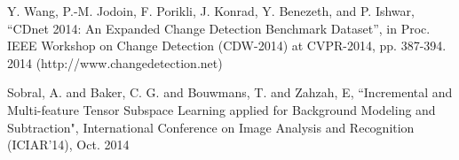 \documentclass[conference]{IEEEtran}
\begin{document}
\begin{thebibliography}{7}
Y. Wang, P.-M. Jodoin, F. Porikli, J. Konrad, Y. Benezeth, and P. Ishwar, ``CDnet 2014: An Expanded Change Detection Benchmark Dataset'', 
in Proc. IEEE Workshop on Change Detection (CDW-2014) at CVPR-2014, pp. 387-394. 2014
(http://www.changedetection.net)


Sobral, A. and Baker, C. G. and Bouwmans, T. and Zahzah, E, ``Incremental and Multi-feature Tensor Subspace Learning applied for Background Modeling and Subtraction", International Conference on Image Analysis and Recognition (ICIAR'14), Oct. 2014



\end{thebibliography}
\end{document}
